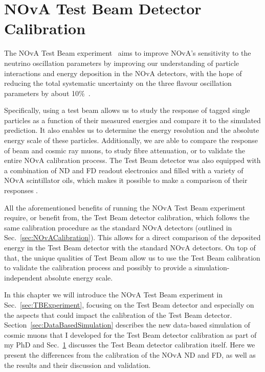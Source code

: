 \chapter{NOvA Test Beam Detector Calibration}\label{sec:TestBeamCalibration}

The \gls{NOvA} Test Beam experiment~\cite{NOvATestBeamWallbangProceedings2020.pdf} aims to improve \gls{NOvA}'s sensitivity to the neutrino oscillation parameters by improving our understanding of particle interactions and energy deposition in the \gls{NOvA} detectors, with the hope of reducing the total systematic uncertainty on the three flavour oscillation parameters by about 10\%~\cite{NOvA-doc-33012}.
 
Specifically, using a test beam allows us to study the response of tagged single particles as a function of their measured energies and compare it to the simulated prediction. It also enables us to determine the energy resolution and the absolute energy scale of these particles. Additionally, we are able to compare the response of beam and cosmic ray muons, to study fibre attenuation, or to validate the entire \gls{NOvA} calibration process. The Test Beam detector was also equipped with a combination of \gls{ND} and \gls{FD} readout electronics and filled with a variety of \gls{NOvA} scintillator oils, which makes it possible to make a comparison of their responses \cite{NOvA-doc-15750}.

All the aforementioned benefits of running the \gls{NOvA} Test Beam experiment require, or benefit from, the Test Beam detector calibration, which follows the same calibration procedure as the standard NOvA detectors (outlined in Sec.~\ref{sec:NOvACalibration}). This allows for a direct comparison of the deposited energy in the Test Beam detector with the standard \gls{NOvA} detectors. On top of that, the unique qualities of Test Beam allow us to use the Test Beam calibration to validate the calibration process and possibly to provide a simulation-independent absolute energy scale.

In this chapter we will introduce the \gls{NOvA} Test Beam experiment in Sec.~\ref{sec:TBExperiment}, focusing on the Test Beam detector and especially on the aspects that could impact the calibration of the Test Beam detector. Section~\ref{sec:DataBasedSimulation} describes the new data-based simulation of cosmic muons that I developed for the Test Beam detector calibration as part of my PhD and Sec.~\ref{sec:TestBeamCalibration} discusses the Test Beam detector calibration itself. Here we present the differences from the calibration of the \gls{NOvA} \gls{ND} and \gls{FD}, as well as the results and their discussion and validation.

